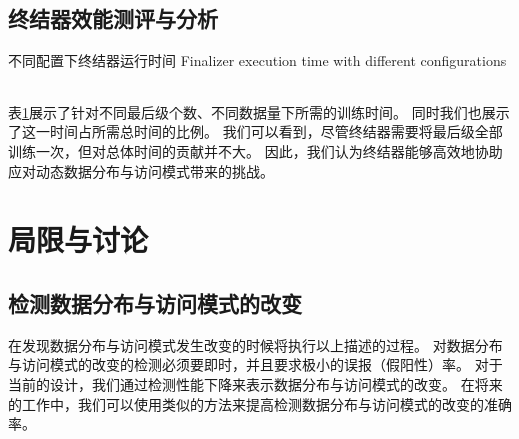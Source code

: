 \subsection{终结器效能测评与分析}

\begin{table}[!hpb]
  \centering
  \bicaption[不同配置下终结器运行时间]
    {不同配置下终结器运行时间}
    {Finalizer execution time with different configurations}
  \label{tab:finalizer}
  \begin{tabular}{@{}llr@{}} \toprule
  \end{tabular}
\end{table}

表\ref{tab:finalizer}展示了针对不同{\rmi}最后级{\model}个数、不同数据量下所需的训练时间。
同时我们也展示了这一时间占{\sys}所需总时间的比例。
我们可以看到，尽管终结器需要将{\rmi}最后级{\model}全部训练一次，但对总体时间的贡献并不大。
因此，我们认为终结器能够高效地协助{\sys}应对动态数据分布与访问模式带来的挑战。

\section{局限与讨论}

\subsection{检测数据分布与访问模式的改变}

{\sys}在发现数据分布与访问模式发生改变的时候将执行以上描述的过程。
对数据分布与访问模式的改变的检测必须要即时，并且要求极小的误报（假阳性）率。
对于当前的设计，我们通过检测性能下降来表示数据分布与访问模式的改变。
在将来的工作中，我们可以使用类似\cite{kang2017noscope}的方法来提高检测数据分布与访问模式的改变的准确率。


